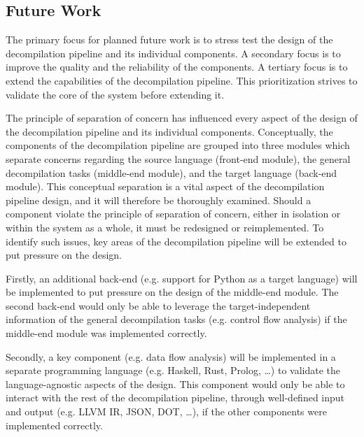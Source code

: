 
\subsection{Future Work}
\label{sec:future_work}


The primary focus for planned future work is to stress test the design of the decompilation pipeline and its individual components. A secondary focus is to improve the quality and the reliability of the components. A tertiary focus is to extend the capabilities of the decompilation pipeline. This prioritization strives to validate the core of the system before extending it.

The principle of separation of concern has influenced every aspect of the design of the decompilation pipeline and its individual components. Conceptually, the components of the decompilation pipeline are grouped into three modules which separate concerns regarding the source language (front-end module), the general decompilation tasks (middle-end module), and the target language (back-end module). This conceptual separation is a vital aspect of the decompilation pipeline design, and it will therefore be thoroughly examined. Should a component violate the principle of separation of concern, either in isolation or within the system as a whole, it must be redesigned or reimplemented. To identify such issues, key areas of the decompilation pipeline will be extended to put pressure on the design.


Firstly, an additional back-end (e.g. support for Python as a target language) will be implemented to put pressure on the design of the middle-end module. The second back-end would only be able to leverage the target-independent information of the general decompilation tasks (e.g. control flow analysis) if the middle-end module was implemented correctly.

Secondly, a key component (e.g. data flow analysis) will be implemented in a separate programming language (e.g. Haskell, Rust, Prolog, …) to validate the language-agnostic aspects of the design. This component would only be able to interact with the rest of the decompilation pipeline, through well-defined input and output (e.g. LLVM IR, JSON, DOT, …), if the other components were implemented correctly.

